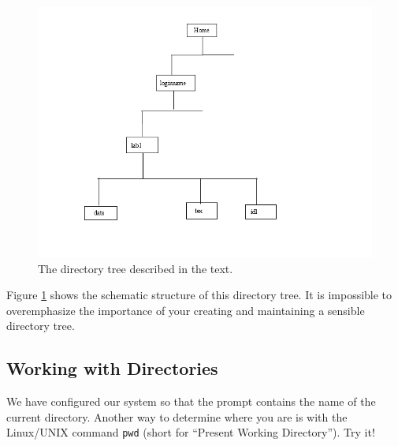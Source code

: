 \documentclass[psfig,preprint]{aastex}
\begin{document}
\begin{figure}[h!]
\begin{center}
\includegraphics[scale=0.4]{dirtree.png}
\end{center}
\caption{The directory tree described in the text. 
\label{dirtree}}
\end{figure}

Figure \ref{dirtree} shows the schematic structure of this directory
tree. It is impossible to overemphasize the importance of your creating
and maintaining a sensible directory tree.

\subsection{Working with Directories}

We have configured our system so that the prompt contains the name of
the current directory. Another way to determine where you are is with
the Linux/UNIX command {\tt pwd} (short for ``Present Working
Directory''). Try it!
\end{document}
